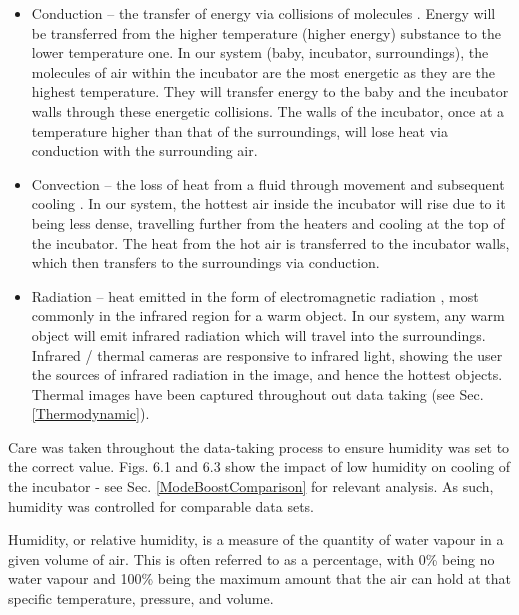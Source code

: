 \documentclass{article}
\begin{document}
\begin{itemize}

\item Conduction – the transfer of energy via collisions of molecules \cite{JG1}. Energy will be transferred from the higher temperature (higher energy) substance to the lower temperature one. In our system (baby, incubator, surroundings), the molecules of air within the incubator are the most energetic as they are the highest temperature. They will transfer energy to the baby and the incubator walls through these energetic collisions. The walls of the incubator, once at a temperature higher than that of the surroundings, will lose heat via conduction with the surrounding air. 
 \vspace{1.5mm}
 
\item Convection – the loss of heat from a fluid through movement and subsequent cooling \cite{JG2}. In our system, the hottest air inside the incubator will rise due to it being less dense, travelling further from the heaters and cooling at the top of the incubator. The heat from the hot air is transferred to the incubator walls, which then transfers to the surroundings via conduction. 
 \vspace{1.5mm}
 
\item Radiation – heat emitted in the form of electromagnetic radiation \cite{JG3}, most commonly in the infrared region for a warm object. In our system, any warm object will emit infrared radiation which will travel into the surroundings. Infrared / thermal cameras are responsive to infrared light, showing the user the sources of infrared radiation in the image, and hence the hottest objects. Thermal images have been captured throughout out data taking (see Sec. \ref{Thermodynamic}). 

 \end{itemize}

Care was taken throughout the data-taking process to ensure humidity was set to the correct value. Figs. 6.1 and 6.3 show the impact of low humidity on cooling of the incubator - see Sec. \ref{ModeBoostComparison} for relevant analysis. As such, humidity was controlled for comparable data sets.  

 \vspace{3mm}

Humidity, or relative humidity, is a measure of the quantity of water vapour in a given volume of air. This is often referred to as a percentage, with 0\% being no water vapour and 100\% being the maximum amount that the air can hold at that specific temperature, pressure, and volume. 
\end{document}
